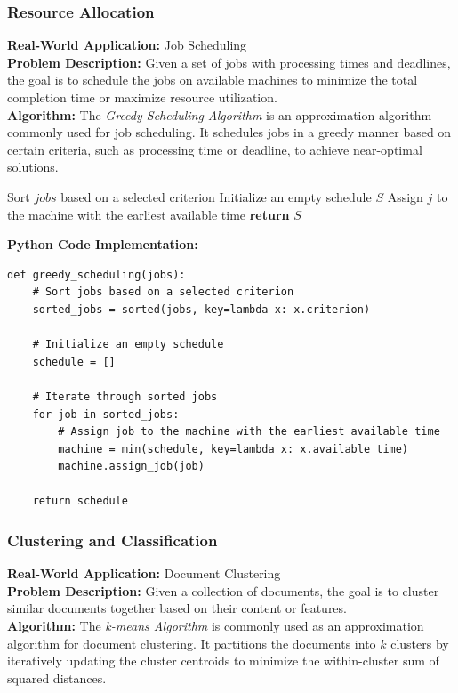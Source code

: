 \documentclass[12pt]{book} %
\begin{document}
\subsubsection{Resource Allocation}

\textbf{Real-World Application:} Job Scheduling \\
\textbf{Problem Description:} Given a set of jobs with processing times and deadlines, the goal is to schedule the jobs on available machines to minimize the total completion time or maximize resource utilization. \\
\textbf{Algorithm:} The \textit{Greedy Scheduling Algorithm} is an approximation algorithm commonly used for job scheduling. It schedules jobs in a greedy manner based on certain criteria, such as processing time or deadline, to achieve near-optimal solutions.
\FloatBarrier
\begin{algorithm}
\caption{Greedy Scheduling Algorithm}
\begin{algorithmic}[1]
\State Sort $jobs$ based on a selected criterion
\State Initialize an empty schedule $S$
    \State Assign $j$ to the machine with the earliest available time
\EndFor
\State \textbf{return} $S$
\EndProcedure
\end{algorithmic}
\end{algorithm}
\FloatBarrier
\textbf{Python Code Implementation:}
\FloatBarrier
\begin{lstlisting}
def greedy_scheduling(jobs):
    # Sort jobs based on a selected criterion
    sorted_jobs = sorted(jobs, key=lambda x: x.criterion)
    
    # Initialize an empty schedule
    schedule = []
    
    # Iterate through sorted jobs
    for job in sorted_jobs:
        # Assign job to the machine with the earliest available time
        machine = min(schedule, key=lambda x: x.available_time)
        machine.assign_job(job)
    
    return schedule
\end{lstlisting}

\subsubsection{Clustering and Classification}

\textbf{Real-World Application:} Document Clustering \\
\textbf{Problem Description:} Given a collection of documents, the goal is to cluster similar documents together based on their content or features. \\
\textbf{Algorithm:} The \textit{k-means Algorithm} is commonly used as an approximation algorithm for document clustering. It partitions the documents into \(k\) clusters by iteratively updating the cluster centroids to minimize the within-cluster sum of squared distances.
\end{document}
